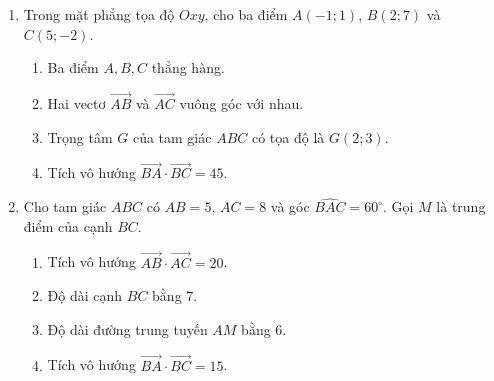 \documentclass[10pt,a4paper]{article}
\begin{document}
\begin{enumerate}
\item Trong mặt phẳng tọa độ $Oxy$, cho ba điểm $A(-1; 1)$, $B(2; 7)$ và $C(5; -2)$.
\begin{enumerate}
    \item Ba điểm $A, B, C$ thẳng hàng.
    \item Hai vectơ $\vec{AB}$ và $\vec{AC}$ vuông góc với nhau.
    \item Trọng tâm $G$ của tam giác $ABC$ có tọa độ là $G(2; 3)$.
    \item Tích vô hướng $\vec{BA} \cdot \vec{BC} = 45$.
\end{enumerate}

\item Cho tam giác $ABC$ có $AB = 5$, $AC = 8$ và góc $\widehat{BAC} = 60^\circ$. Gọi $M$ là trung điểm của cạnh $BC$.
\begin{enumerate}
    \item Tích vô hướng $\vec{AB} \cdot \vec{AC} = 20$.
    \item Độ dài cạnh $BC$ bằng $7$.
    \item Độ dài đường trung tuyến $AM$ bằng $6$.
    \item Tích vô hướng $\vec{BA} \cdot \vec{BC} = 15$.
\end{enumerate}
\end{enumerate}
\end{document}
